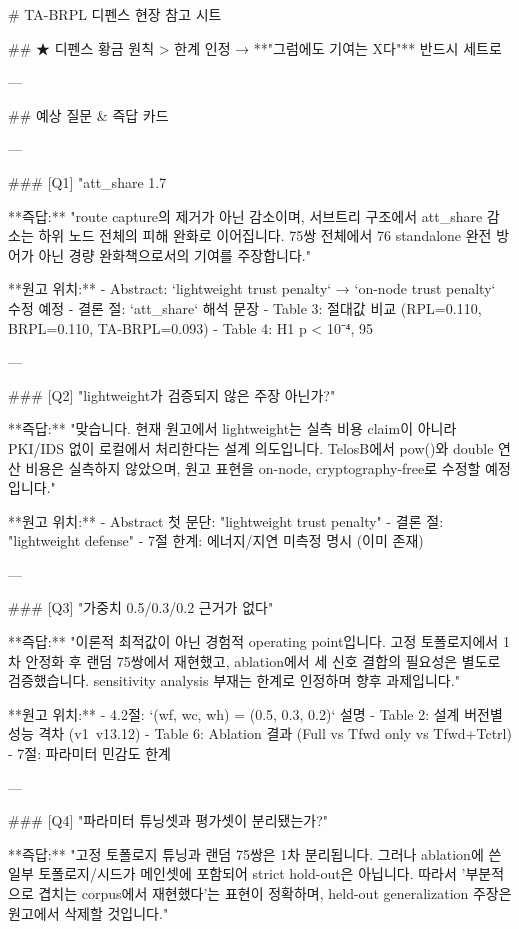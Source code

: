 # TA-BRPL 디펜스 현장 참고 시트

## ★ 디펜스 황금 원칙
> 한계 인정 → **"그럼에도 기여는 X다"** 반드시 세트로

---

## 예상 질문 & 즉답 카드

---

### [Q1] "att_share 1.7%

**즉답:**
"route capture의 제거가 아닌 감소이며, 서브트리 구조에서 att_share 감소는
하위 노드 전체의 피해 완화로 이어집니다.
75쌍 전체에서 76%
standalone 완전 방어가 아닌 경량 완화책으로서의 기여를 주장합니다."

**원고 위치:**
- Abstract: `lightweight trust penalty` → `on-node trust penalty` 수정 예정
- 결론 절: `att_share` 해석 문장
- Table 3: 절대값 비교 (RPL=0.110, BRPL=0.110, TA-BRPL=0.093)
- Table 4: H1 p < 10⁻⁴, 95%

---

### [Q2] "lightweight가 검증되지 않은 주장 아닌가?"

**즉답:**
"맞습니다. 현재 원고에서 lightweight는 실측 비용 claim이 아니라
PKI/IDS 없이 로컬에서 처리한다는 설계 의도입니다.
TelosB에서 pow()와 double 연산 비용은 실측하지 않았으며,
원고 표현을 on-node, cryptography-free로 수정할 예정입니다."

**원고 위치:**
- Abstract 첫 문단: "lightweight trust penalty"
- 결론 절: "lightweight defense"
- 7절 한계: 에너지/지연 미측정 명시 (이미 존재)

---

### [Q3] "가중치 0.5/0.3/0.2 근거가 없다"

**즉답:**
"이론적 최적값이 아닌 경험적 operating point입니다.
고정 토폴로지에서 1차 안정화 후 랜덤 75쌍에서 재현했고,
ablation에서 세 신호 결합의 필요성은 별도로 검증했습니다.
sensitivity analysis 부재는 한계로 인정하며 향후 과제입니다."

**원고 위치:**
- 4.2절: `(wf, wc, wh) = (0.5, 0.3, 0.2)` 설명
- Table 2: 설계 버전별 성능 격차 (v1~v13.12)
- Table 6: Ablation 결과 (Full vs Tfwd only vs Tfwd+Tctrl)
- 7절: 파라미터 민감도 한계

---

### [Q4] "파라미터 튜닝셋과 평가셋이 분리됐는가?"

**즉답:**
"고정 토폴로지 튜닝과 랜덤 75쌍은 1차 분리됩니다.
그러나 ablation에 쓴 일부 토폴로지/시드가 메인셋에 포함되어
strict hold-out은 아닙니다.
따라서 '부분적으로 겹치는 corpus에서 재현했다'는 표현이 정확하며,
held-out generalization 주장은 원고에서 삭제할 것입니다."

